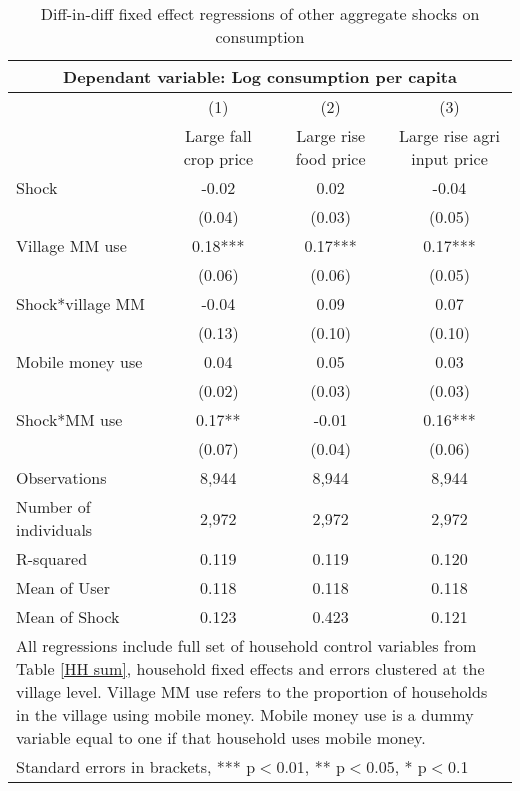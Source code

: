 \begin{table}
\centering \caption{Diff-in-diff fixed effect regressions of other aggregate shocks on consumption} \label{other shocks}
\begin{tabular}{lccc} 
\multicolumn{4}{c}{Dependant variable: Log consumption per capita}\\ \hline
 & (1) & (2) & (3) \\
 & Large fall crop price & Large rise food price & Large rise agri input price \\ \hline
Shock & -0.02 & 0.02  & -0.04  \\
 & (0.04) & (0.03)  & (0.05)  \\
Village MM use & 0.18*** & 0.17*** & 0.17*** \\
 & (0.06) & (0.06) & (0.05) \\
Shock*village MM & -0.04 & 0.09   & 0.07   \\
 & (0.13)  & (0.10)  & (0.10) \\
Mobile money use & 0.04 & 0.05 & 0.03 \\
 & (0.02) & (0.03) & (0.03) \\
Shock*MM use & 0.17** & -0.01  & 0.16***
  \\
 & (0.07) & (0.04)  & (0.06) \\

Observations & 8,944 & 8,944 & 8,944 \\
Number of individuals & 2,972 & 2,972 & 2,972 \\
R-squared & 0.119 & 0.119 & 0.120 \\
  \hline
Mean of User & 0.118 & 0.118 & 0.118 \\
 Mean of Shock & 0.123 & 0.423 & 0.121 \\ \hline
\multicolumn{4}{p{14cm}}{ All regressions include full set of household control variables from Table \ref{HH sum}, household fixed effects and errors clustered at the village level. Village MM use refers to the proportion of households in the village using mobile money. Mobile money use is a dummy variable equal to one if that household uses mobile money. } \\
\multicolumn{4}{l}{ Standard errors in brackets, *** p$<$0.01, ** p$<$0.05, * p$<$0.1} \\
\end{tabular}
\end{table}
